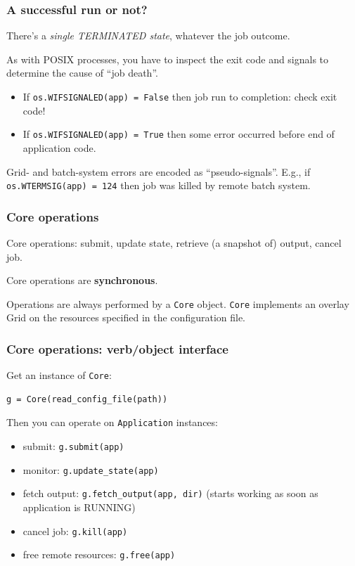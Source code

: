 \documentclass[presentation]{beamer}
\begin{document}
\begin{frame}
\frametitle{A successful run or not?}
\label{sec-12}

  There's a \emph{single TERMINATED state}, whatever the job outcome.
  
  As with POSIX processes, you have to inspect the exit code and
  signals to determine the cause of ``job death''.
\begin{itemize}
\item If \texttt{os.WIFSIGNALED(app) = False} then job run to completion:
    check exit code!
\item If \texttt{os.WIFSIGNALED(app) = True} then some error occurred before
    end of application code.
\end{itemize}
  
  Grid- and batch-system errors are encoded as ``pseudo-signals''.
  E.g., if \texttt{os.WTERMSIG(app) = 124} then job was killed by remote
  batch system.
  
\end{frame}
\begin{frame}
\frametitle{Core operations}
\label{sec-13}

  Core operations: submit, update state, retrieve (a
  snapshot of) output, cancel job.

  Core operations are \textbf{synchronous}.
  
  Operations are always performed by a \texttt{Core} object.
  \texttt{Core} implements an overlay Grid on the resources 
  specified in the configuration file.
\end{frame}
\begin{frame}[fragile]
\frametitle{Core operations: verb/object interface}
\label{sec-14}

  Get an instance of \texttt{Core}:
\begin{verbatim}
g = Core(read_config_file(path))
\end{verbatim}

  Then you can operate on \texttt{Application} instances:
\begin{itemize}
\item submit: \texttt{g.submit(app)}
\item monitor: \texttt{g.update\_state(app)}
\item fetch output: \texttt{g.fetch\_output(app, dir)} (starts working as soon as
    application is RUNNING)
\item cancel job: \texttt{g.kill(app)}
\item free remote resources: \texttt{g.free(app)}
\end{itemize}
\end{frame}
\end{document}

